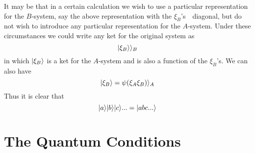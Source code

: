 	It may be that in a certain calculation we wish to use a particular representation for the $B$-system, say the above representation with the $\xi_B$'s　diagonal, but do not wish to introduce any particular representation for the $A$-system. Under these circumstances we could write any ket for the original system as 
	\begin{equation}
	| \xi_B \rangle \rangle_B
	\end{equation}
	in which $| \xi_B \rangle$ is a ket for the $A$-system and is also a function of the $\xi_B$'s. We can also have
	\begin{equation}
	| \xi_B \rangle=\psi(\xi_A\xi_B)\rangle_A
	\end{equation}
	Thus it is clear that
	\begin{equation}
	| a \rangle| b \rangle| c \rangle...=| abc... \rangle
	\end{equation}


\section{The Quantum Conditions}

